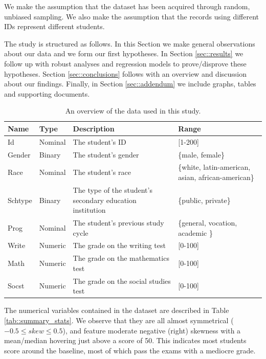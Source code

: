 \documentclass[10pt]{article}
\begin{document}
	We make the assumption that the dataset has been acquired through random, unbiased sampling. We also make the assumption that the records using different IDs represent different students.
	
	The study is structured as follows. In this Section we make general observations about our data and we form our first hypotheses. In Section \ref{sec::results} we follow up with robust analyses and regression models to prove/disprove these hypotheses. Section \ref{sec::conclusions} follows with an overview and discussion about our findings. Finally, in Section \ref{sec::addendum} we include graphs, tables and supporting documents.
	
	\begin{table}[h]
		\centering
		\begin{tabular}
			{ |p{1cm} p{1cm} p{5cm} p{3cm}| }
			\hline
			\textbf{Name} & \textbf{Type} & \textbf{Description} & \textbf{Range}\\
			\hline
			Id  & Nominal & The student's ID & [1-200] \\
			Gender  & Binary & The student's gender & \{male, female\} \\
			Race  & Nominal & The student's race & \{white, latin-american, asian, african-american\} \\
			Schtype  & Binary & The type of the student's secondary education institution & \{public, private\} \\
			Prog  & Nominal & The student's previous study cycle  & \{general, vocation, academic \} \\
			Write  & Numeric & The grade on the writing test  & [0-100] \\
			Math  & Numeric & The grade on the mathematics test  & [0-100] \\
			Socst  & Numeric & The grade on the social studies test & [0-100] \\
			\hline
		\end{tabular}
		\caption{An overview of the data used in this study.}
		\label{tab::dataset}
	\end{table}

	

	The numerical variables contained in the dataset are described in Table \ref{tab::summary_stats}. We observe that they are all almost symmetrical ($-0.5 \leq skew \leq 0.5$), and feature moderate negative (right) skewness with a mean/median hovering just above a score of 50. This indicates most students score around the baseline, most of which pass the exams with a mediocre grade.
\end{document}
